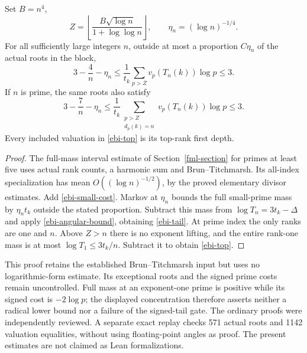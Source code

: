 \begin{theorem}
\label{ebi-location}
Set $B=n^4$,
\[
 Z=\left\lfloor\frac{B\sqrt{\log n}}{1+\log\log n}\right\rfloor,
 \qquad \eta_n=(\log n)^{-1/4}.
\]
For all sufficiently large integers $n$, outside at most a proportion
$C\eta_n$ of the actual roots in the block,
\begin{equation}\label{ebi-tail}
 3-\frac4n-\eta_n
 \le\frac1{t_k}\sum_{p>Z}v_p(T_n(k))\log p\le3.
\end{equation}
If $n$ is prime, the same roots also satisfy
\begin{equation}\label{ebi-top}
 3-\frac7n-\eta_n
 \le\frac1{t_k}\sum_{\substack{p>Z\\d_p(k)=n}}
       v_p(T_n(k))\log p\le3.
\end{equation}
Every included valuation in \eqref{ebi-top} is its top-rank first depth.
\end{theorem}
\begin{proof}
The full-mass interval estimate of Section~\ref{fml-section} for primes
at least five uses actual rank counts, a harmonic sum and
Brun--Titchmarsh. Its all-index specialization has mean
$O((\log n)^{-1/2})$, by the proved elementary divisor estimates.
Add \eqref{ebi-small-cost}. Markov at $\eta_n$ bounds the full
small-prime mass by $\eta_n t_k$ outside the stated proportion.
Subtract this mass from $\log T_n=3t_k-\Delta$ and apply
\eqref{ebi-angular-bound}, obtaining \eqref{ebi-tail}.
At prime index the only ranks are one and $n$. Above $Z>n$ there
is no exponent lifting, and the entire rank-one mass is at most
$\log T_1\le3t_k/n$. Subtract it to obtain \eqref{ebi-top}.
\end{proof}

This proof retains the established Brun--Titchmarsh input but uses no
logarithmic-form estimate. Its exceptional roots and the signed
prime costs remain uncontrolled. Full mass at an exponent-one prime
is positive while its signed cost is $-2\log p$; the displayed
concentration therefore asserts neither a radical lower bound nor a
failure of the signed-tail gate. The ordinary proofs were independently
reviewed. A separate exact replay checks 571 actual roots and 1142
valuation equalities, without using floating-point angles as proof.
The present estimates are not claimed as Lean formalizations.

